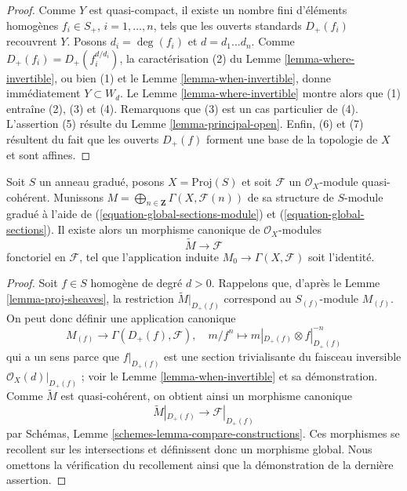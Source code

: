 \begin{proof}
Comme $Y$ est quasi-compact, il existe un nombre fini d'éléments homogènes
$f_i \in S_{+}$, $i = 1, \ldots, n$, tels que les ouverts standards
$D_{+}(f_i)$ recouvrent $Y$. Posons $d_i = \deg(f_i)$ et
$d = d_1 \ldots d_n$. Comme
$D_{+}(f_i) = D_{+}(f_i^{d/d_i})$, la caractérisation (2) du
Lemme \ref{lemma-where-invertible}, ou bien (1) et le
Lemme \ref{lemma-when-invertible}, donne immédiatement $Y \subset W_d$.
Le Lemme \ref{lemma-where-invertible} montre alors que (1) entraîne (2), (3)
et (4). Remarquons que (3) est un cas particulier de (4).
L'assertion (5) résulte du Lemme \ref{lemma-principal-open}.
Enfin, (6) et (7) résultent du fait que les ouverts $D_{+}(f)$ forment une
base de la topologie de $X$ et sont affines.
\end{proof}

\begin{lemma}
\label{lemma-comparison-proj-quasi-coherent}
Soit $S$ un anneau gradué, posons $X = \text{Proj}(S)$ et soit
$\mathcal{F}$ un $\mathcal{O}_X$-module quasi-cohérent. Munissons
$M = \bigoplus_{n \in \mathbf{Z}} \Gamma(X, \mathcal{F}(n))$ de sa structure
de $S$-module gradué à l'aide de
(\ref{equation-global-sections-module}) et (\ref{equation-global-sections}).
Il existe alors un morphisme canonique de $\mathcal{O}_X$-modules
$$
\widetilde{M} \longrightarrow \mathcal{F}
$$
fonctoriel en $\mathcal{F}$, tel que l'application induite
$M_0 \to \Gamma(X, \mathcal{F})$ soit l'identité.
\end{lemma}

\begin{proof}
Soit $f \in S$ homogène de degré $d > 0$. Rappelons que, d'après le
Lemme \ref{lemma-proj-sheaves}, la restriction
$\widetilde{M}|_{D_{+}(f)}$ correspond au $S_{(f)}$-module $M_{(f)}$.
On peut donc définir une application canonique
$$
M_{(f)} \longrightarrow \Gamma(D_+(f), \mathcal{F}),\quad
m/f^n \longmapsto m|_{D_+(f)} \otimes f|_{D_+(f)}^{-n}
$$
qui a un sens parce que $f|_{D_+(f)}$ est une section trivialisante du
faisceau inversible $\mathcal{O}_X(d)|_{D_+(f)}$ ; voir le
Lemme \ref{lemma-when-invertible} et sa démonstration. Comme $\widetilde{M}$
est quasi-cohérent, on obtient ainsi un morphisme canonique
$$
\widetilde{M}|_{D_+(f)} \longrightarrow \mathcal{F}|_{D_+(f)}
$$
par Schémas, Lemme \ref{schemes-lemma-compare-constructions}.
Ces morphismes se recollent sur les intersections et définissent donc un
morphisme global. Nous omettons la vérification du recollement ainsi que la
démonstration de la dernière assertion.
\end{proof}










